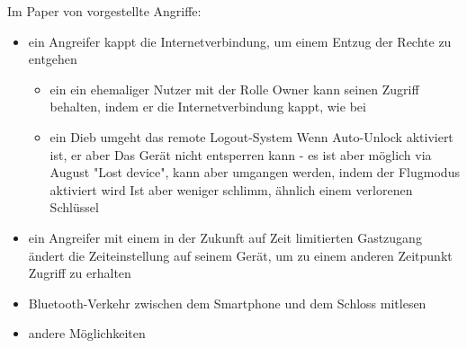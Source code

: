 	Im Paper von \cite{Fuller2017} vorgestellte Angriffe:
	\begin{itemize}
	    \item ein Angreifer kappt die Internetverbindung, um einem Entzug der Rechte zu entgehen
	        \begin{itemize}
	            \item ein ein ehemaliger Nutzer mit der Rolle Owner kann seinen Zugriff behalten, indem er die Internetverbindung kappt, wie bei \cite{Ho2016}
	            \item ein Dieb umgeht das remote Logout-System
	                Wenn Auto-Unlock aktiviert ist, er aber Das Gerät nicht entsperren kann - es ist aber möglich via August "Lost device", kann aber umgangen werden, indem der Flugmodus aktiviert wird
	                Ist aber weniger schlimm, ähnlich einem verlorenen Schlüssel
	        \end{itemize}
	    \item ein Angreifer mit einem in der Zukunft auf Zeit limitierten Gastzugang ändert die Zeiteinstellung auf seinem Gerät, um zu einem anderen Zeitpunkt Zugriff zu erhalten
	    \item Bluetooth-Verkehr zwischen dem Smartphone und dem Schloss mitlesen
	    \item andere Möglichkeiten
	\end{itemize}
	

